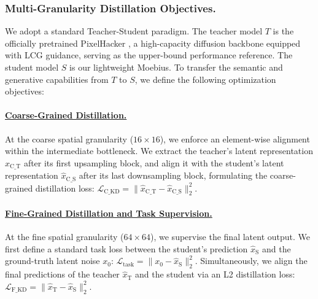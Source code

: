 \documentclass{llmxive}
\begin{document}
\vspace{-0.5em}
\vspace{-0.9em}
\subsubsection{Multi-Granularity Distillation Objectives.}
We adopt a standard Teacher-Student paradigm. The teacher model $T$ is the officially pretrained PixelHacker \cite{xu2025pixelhacker}, a high-capacity diffusion backbone equipped with LCG guidance, serving as the upper-bound performance reference. The student model $S$ is our lightweight Moebius. To transfer the semantic and generative capabilities from $T$ to $S$, we define the following optimization objectives:

\vspace{-0.5em}
\vspace{-0.9em}
\paragraph{\underline{Coarse-Grained Distillation.}}
At the coarse spatial granularity ($16\times16$), we enforce an element-wise alignment within the intermediate bottleneck. We extract the teacher's latent representation $\hat{x}_\mathrm{C\_T}$ after its first upsampling block, and align it with the student's latent representation $\hat{x}_\mathrm{C\_S}$ after its last downsampling block, formulating the coarse-grained distillation loss: $\mathcal{L}_\mathrm{C\_KD} = \| \hat{x}_\mathrm{C\_T} - \hat{x}_\mathrm{C\_S} \|^2_2$.

\vspace{-0.5em}
\vspace{-0.5em}
\paragraph{\underline{Fine-Grained Distillation and Task Supervision.}}
At the fine spatial granularity ($64\times64$), we supervise the final latent output. We first define a standard task loss between the student's prediction $\hat{x}_\mathrm{S}$ and the ground-truth latent noise $x_0$: $\mathcal{L}_\mathrm{task} =  \| x_0 - \hat{x}_\mathrm{S} \|^2_2$.
Simultaneously, we align the final predictions of the teacher $\hat{x}_\mathrm{T}$ and the student via an L2 distillation loss: $\mathcal{L}_\mathrm{F\_KD} = \| \hat{x}_\mathrm{T} - \hat{x}_\mathrm{S} \|^2_2$.

\vspace{-0.5em}
\vspace{-0.25em}
\end{document}
